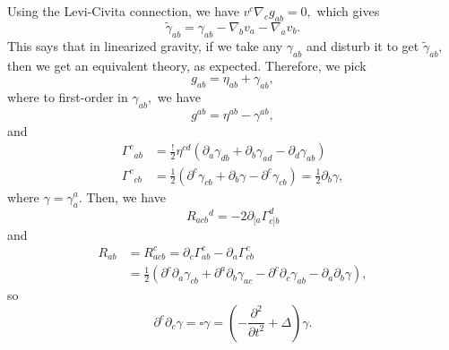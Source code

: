 \documentclass{article}
\numberwithin{equation}{section}
\begin{document}
Using the Levi-Civita connection, we have $v^c\nabla_c g_{ab}=0,$ which gives 
\begin{equation*}
    \tilde{\gamma}_{ab} = \gamma_{ab} - \nabla_bv_a - \nabla_av_b.
\end{equation*}
This says that in linearized gravity, if we take any $\gamma_{ab}$ and disturb it to get $\tilde{\gamma}_{ab},$ then we get an equivalent theory, as expected. Therefore, we pick 
\begin{equation*}
    g_{ab} = \eta_{ab} + \gamma_{ab},
\end{equation*}
where to first-order in $\gamma_{ab},$ we have 
\begin{equation*}
    g^{ab} = \eta^{ab} - \gamma^{ab},
\end{equation*}
and 
\begin{align*}
    \Gamma^c{}_{ab} &= \frac{!}{2}\eta^{cd}(\partial_a\gamma_{db}+\partial_b\gamma_{ad} - \partial_d\gamma_{ab}) \\ 
    \Gamma^c{}_{cb} &= \frac{1}{2}\left(\partial^c\gamma_{cb} + \partial_b\gamma - \partial^c\gamma_{cb}\right) = \frac{1}{2}\partial_b\gamma,
\end{align*}
where $\gamma =\gamma^a_a.$ Then, we have 
\begin{equation*}
    R_{acb}{}^d = -2\partial_{[a}\Gamma^d_{c]b}
\end{equation*}
and 
\begin{align*}
    R_{ab} &= R_{acb}^{c} = \partial_c \Gamma^c_{ab} - \partial_a\Gamma^c_{cb} \\ 
    &= \frac{1}{2}\left(\partial^c\partial_a\gamma_{cb} + \partial^a\partial_b\gamma_{ac} - \partial^c\partial_c\gamma_{ab}-\partial_a\partial_b\gamma\right),
\end{align*}
so 
\begin{equation*}
    \partial^c\partial_c \gamma = \square \gamma = \left(-\frac{\partial^2}{\partial t^2} + \Delta\right)\gamma.
\end{equation*}
\end{document}
